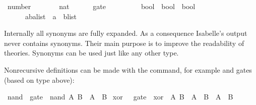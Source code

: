 %
\begin{isabellebody}%
\def\isabellecontext{types}%
%
\isadelimtheory
%
\endisadelimtheory
%
\isatagtheory
%
\endisatagtheory
{\isafoldtheory}%
%
\isadelimtheory
%
\endisadelimtheory
{}\isamarkupfalse%
\ number\ \ \ \ \ \ \ {}\ nat\isanewline
\ \ \ \ \ \ gate\ \ \ \ \ \ \ \ \ {}\ {}bool\ {}\ bool\ {}\ bool{}\isanewline
\ \ \ \ \ \ {}{}a{}{}b{}alist\ {}\ {}{}{}a\ {}\ {}b{}list{}%
\begin{isamarkuptext}%
\noindent
Internally all synonyms are fully expanded.  As a consequence Isabelle's
output never contains synonyms.  Their main purpose is to improve the
readability of theories.  Synonyms can be used just like any other
type.%
\end{isamarkuptext}%
\isamarkuptrue%
%
\isamarkuptrue%
%
\begin{isamarkuptext}%
\label{sec:ConstDefinitions}%
Nonrecursive definitions can be made with the 
command, for example  and  gates
(based on type  above):%
\end{isamarkuptext}%
\isamarkuptrue%
\isamarkupfalse%
\ nand\ {}{}\ gate\ \ {}nand\ A\ B\ {}\ {}{}A\ {}\ B{}{}\isanewline
{}\isamarkupfalse%
\ xor\ \ {}{}\ gate\ \ {}xor\ \ A\ B\ {}\ A\ {}\ {}B\ {}\ {}A\ {}\ B{}%

\end{isabellebody}
